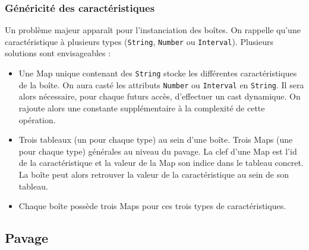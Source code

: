 
\subsubsection{Généricité des caractéristiques}
Un problème majeur apparaît pour l'instanciation des boîtes. On rappelle qu'une caractéristique à plusieurs types (\verb+String+, \verb+Number+ ou \verb+Interval+). Plusieurs solutions sont envisageables : 
\begin{itemize}
\item
  Une Map unique contenant des \verb+String+ stocke les différentes caractéristiques de la boîte. On aura casté les attributs \verb+Number+ ou \verb+Interval+ en \verb+String+. Il sera alors nécessaire, pour chaque futurs accès, d'effectuer un cast dynamique. On rajoute alors une constante supplémentaire à la complexité de cette opération. 
\item 
Trois tableaux (un pour chaque type) au sein d'une boîte. Trois Maps (une pour chaque type) \og générales \fg{} au niveau du pavage. La clef d'une Map est l'id de la caractéristique et la valeur de la Map son indice dans le tableau concret. La boîte peut alors retrouver la valeur de la caractéristique au sein de son tableau.
\item 
  Chaque boîte possède trois Maps pour ces trois types de caractéristiques. 
\end{itemize}


\subsection{Pavage}
